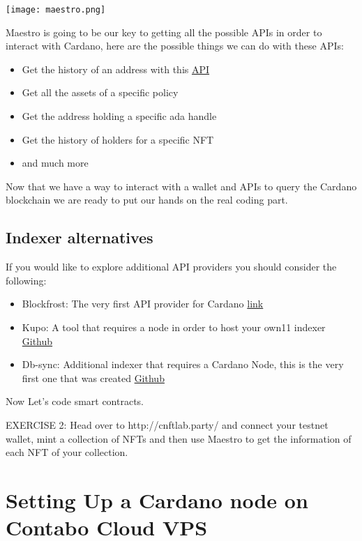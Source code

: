 \texttt{[image: maestro.png]}

Maestro is going to be our key to getting all the possible APIs in order to interact with Cardano, here are the possible things we can do with these APIs:

\begin{itemize}
  \item Get the history of an address with this \href{ttps://docs.gomaestro.org/Indexer-API/Addresses/txs-by-address}{API}
  \item Get all the assets of a specific policy
  \item Get the address holding a specific ada handle
  \item Get the history of holders for a specific NFT
  \item and much more
\end{itemize}

Now that we have a way to interact with a wallet and APIs to query the Cardano blockchain we are ready to put our hands on the real coding part.

\subsection{Indexer alternatives}

If you would like to explore additional API providers you should consider the following:

\begin{itemize}
  \item Blockfrost: The very first API provider for Cardano \href{https://blockfrost.io/dashboard}{link}
  \item Kupo: A tool that requires a node in order to host your own11 indexer \href{https://github.com/CardanoSolutions/kupo}{Github}
  \item Db-sync: Additional indexer that requires a Cardano Node, this is the very first one that was created \href{https://github.com/IntersectMBO/cardano-db-sync}{Github}
\end{itemize}

Now Let's code smart contracts.

\begin{remark}
  EXERCISE 2: Head over to http://cnftlab.party/ and connect your testnet wallet, mint a collection of NFTs and then use Maestro to get the information of each NFT of your collection.
\end{remark}


\section{Setting Up a Cardano node on Contabo Cloud VPS}

